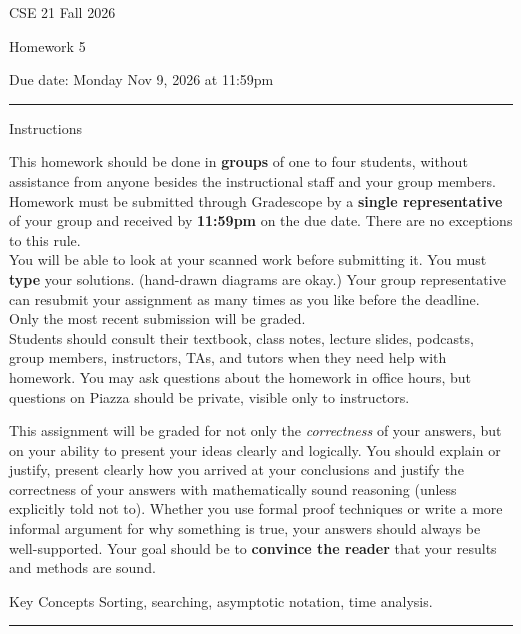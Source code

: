 \documentclass[10pt,letterpaper,unboxed,cm]{article}
\theoremstyle{definition}
\begin{document}
\hfill{CSE 21 Fall 2026}

\hfill{Homework 5}

\hfill{Due date: Monday Nov 9, 2026 at 11:59pm}

\begin{center}
\begin{minipage}[t]{5.7in}
\rule{\linewidth}{2pt}
{\sc Instructions}\newline

This homework should be done in {\bf groups} of one to four students, without assistance from anyone besides the instructional staff and your group members.  Homework must be submitted through Gradescope by a {\bf single representative} of your group and received by {\bf 11:59pm} on the due date. There are no exceptions to this rule.\\
 
You will be able to look at your scanned work before submitting it. 
 You must {\bf type} your solutions. (hand-drawn diagrams are okay.)
 Your group representative can resubmit your assignment as many times as you like before the deadline. Only the most recent submission will be graded.\\

Students should consult their textbook, class notes, lecture slides, podcasts, group members, instructors, TAs, and tutors when 
they need help with homework. You may ask questions about the homework in office hours, but questions on Piazza should be private, visible only to instructors. 

This assignment will be graded for not only the \emph{correctness} of your answers, but on your ability to present your ideas clearly and logically. You should explain or justify, present clearly how you arrived at your conclusions and justify the correctness of your answers with mathematically sound reasoning (unless explicitly told not to). Whether you use formal proof techniques or write a more informal argument for why something is true, your answers should always be well-supported. Your goal should be to {\bf convince the reader} that your results and methods are sound.






{\sc Key Concepts} Sorting, searching, asymptotic notation, time analysis.



\rule{\linewidth}{2pt}
\end{minipage} \hfill

\end{center}
\newpage
\end{document}
